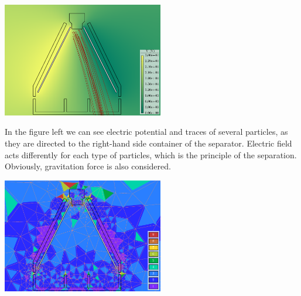 \documentclass[portrait, a1paper, fontscale=0.5]{baposter}
\begin{document}
\begin{poster}
{\begin{center}
	\begin{minipage}{20em}
		\centering
	 	\includegraphics[width=19em]{particle_tracing/scalar_potential_and_particles.png}
	\end{minipage} 
	\begin{minipage}{11em}
		In the figure left we can see electric potential and traces of several particles, as they are directed to the right-hand side container of the separator. Electric field acts differently for each type of particles, which is the principle of the separation. Obviously, gravitation force is also considered.
	\end{minipage}
	\begin{minipage}{20em}
		\centering
	 	\includegraphics[width=19em]{particle_tracing/mesh_and_polynomial_order.png}
	\end{minipage} 
\vspace{0.5mm}
\end{center}

}
\end{poster}
\end{document}
